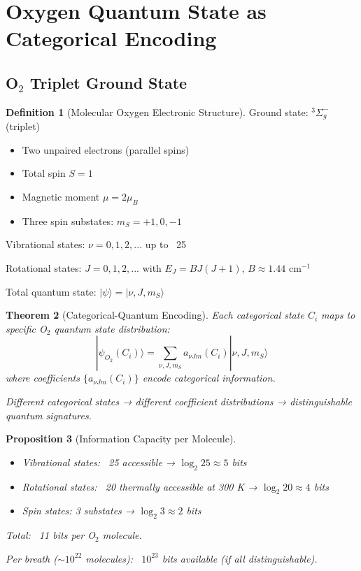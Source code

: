 \documentclass[11pt,a4paper]{article}
\newtheorem{theorem}{Theorem}[section]
\newtheorem{proposition}[theorem]{Proposition}
\theoremstyle{definition}
\newtheorem{definition}[theorem]{Definition}
\theoremstyle{remark}
\begin{document}
\section{Oxygen Quantum State as Categorical Encoding}

\subsection{O$_2$ Triplet Ground State}

\begin{definition}[Molecular Oxygen Electronic Structure]
Ground state: $^3\Sigma_g^-$ (triplet)
\begin{itemize}
\item Two unpaired electrons (parallel spins)
\item Total spin $S = 1$
\item Magnetic moment $\mu = 2\mu_B$
\item Three spin substates: $m_S = +1, 0, -1$
\end{itemize}

Vibrational states: $\nu = 0, 1, 2, ...$ up to ~25

Rotational states: $J = 0, 1, 2, ...$ with $E_J = BJ(J+1)$, $B \approx 1.44$ cm$^{-1}$

Total quantum state: $|\psi\rangle = |\nu, J, m_S\rangle$
\end{definition}

\begin{theorem}[Categorical-Quantum Encoding]
Each categorical state $C_i$ maps to specific O$_2$ quantum state distribution:
\begin{equation}
|\psi_{O_2}(C_i)\rangle = \sum_{\nu,J,m_S} a_{\nu Jm}(C_i) |\nu, J, m_S\rangle
\end{equation}
where coefficients $\{a_{\nu Jm}(C_i)\}$ encode categorical information.

Different categorical states → different coefficient distributions → distinguishable quantum signatures.
\end{theorem}

\begin{proposition}[Information Capacity per Molecule]
\begin{itemize}
\item Vibrational states: ~25 accessible → $\log_2 25 \approx 5$ bits
\item Rotational states: ~20 thermally accessible at 300 K → $\log_2 20 \approx 4$ bits
\item Spin states: 3 substates → $\log_2 3 \approx 2$ bits
\end{itemize}

Total: ~11 bits per O$_2$ molecule.

Per breath ($\sim 10^{22}$ molecules): ~$10^{23}$ bits available (if all distinguishable).
\end{proposition}
\end{document}
